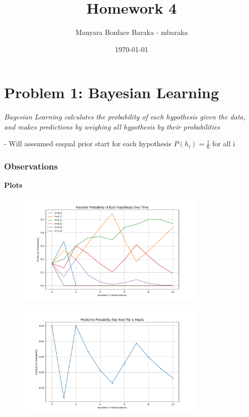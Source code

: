 \documentclass{article}
\begin{document}
\title{Homework 4}
\author{Manyara Bonface Baraka - mbaraka}
\date{\today}
\maketitle

\section*{Problem 1: Bayesian Learning}
\textit{Bayesian Learning calculates the probability of  each hypothesis given the data, and makes predictions by weighing all hypothesis by their probabilities}

- Will asssumed eaqual prior start for each hypothesis \(P(h_i) = \frac{1}{6}\) for all i
\subsubsection*{Observations}
\textbf{Plots}
\begin{figure}[H]
    \centering
    \includegraphics[width=0.8\textwidth]{../Problem1/num_of_observation.png}
    \label{fig:num_of_observation}
\end{figure}

\begin{figure}[H]
    \centering
    \includegraphics[width=0.8\textwidth]{../Problem1/predictive_of_next_head.png}
    \label{fig:num_of_observation}
\end{figure}
\end{document}
